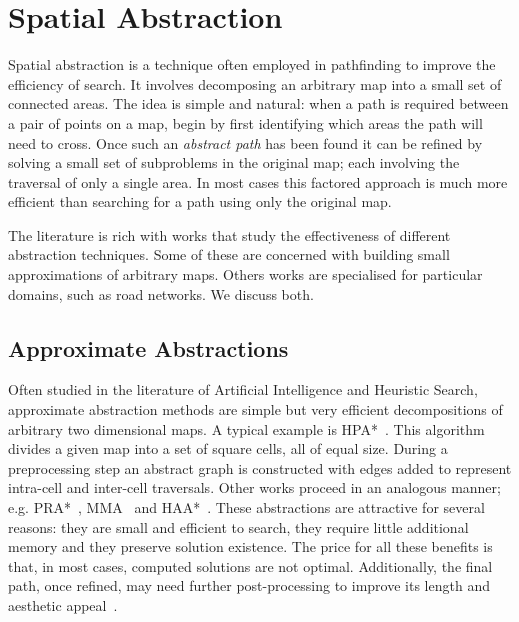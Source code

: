 \section{Spatial Abstraction}
\label{cha::lit::abstraction}
Spatial abstraction is a technique often employed in pathfinding to improve the efficiency of
search. It involves decomposing an arbitrary map into a small set of connected areas. The idea is
simple and natural: when a path is required between a pair of points on a map, begin by first
identifying which areas the path will need to cross. Once such an \emph{abstract path} has been
found it can be refined by solving a small set of subproblems in the original map; each involving
the traversal of only a single area. In most cases this factored approach is much more
efficient than searching for a path using only the original map.

The literature is rich with works that study the effectiveness of different abstraction techniques. 
Some of these are concerned with building small approximations of arbitrary maps.  Others works 
are specialised for particular domains, such as road networks. We discuss both.

\subsection{Approximate Abstractions}
Often studied in the literature of Artificial Intelligence and Heuristic Search, approximate
abstraction methods are simple but very efficient decompositions of arbitrary two dimensional maps.
A typical example is HPA*~\citep{botea04}. This algorithm divides a given map into a set of 
square cells, all of equal size. During a preprocessing step an abstract graph is constructed with
edges added to represent intra-cell and inter-cell traversals.
Other works proceed in an analogous manner; e.g. PRA*~\citep{sturtevant05}, MMA~\citep{sturtevant07}
and HAA*~\citep{harabor08}.  These abstractions are attractive for several reasons: they are small and 
efficient to search, they require little additional memory and they preserve solution existence. 
The price for all these benefits is that, in most cases, computed
solutions are not optimal. Additionally, the final path, once refined, may need further
post-processing to improve its length and aesthetic appeal~\citep{pinter01,botea04}.

